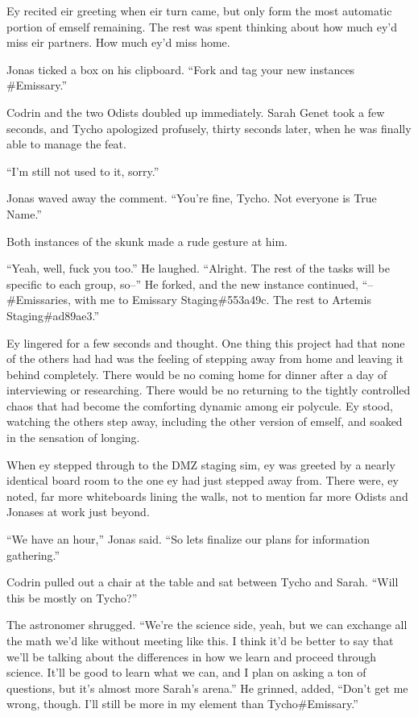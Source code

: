 Ey recited eir greeting when eir turn came, but only form the most automatic portion of emself remaining. The rest was spent thinking about how much ey'd miss eir partners. How much ey'd miss home.

Jonas ticked a box on his clipboard. ``Fork and tag your new instances \#Emissary.''

Codrin and the two Odists doubled up immediately. Sarah Genet took a few seconds, and Tycho apologized profusely, thirty seconds later, when he was finally able to manage the feat.

``I'm still not used to it, sorry.''

Jonas waved away the comment. ``You're fine, Tycho. Not everyone is True Name.''

Both instances of the skunk made a rude gesture at him.

``Yeah, well, fuck you too.'' He laughed. ``Alright. The rest of the tasks will be specific to each group, so--'' He forked, and the new instance continued, ``--\#Emissaries, with me to Emissary Staging\#553a49c. The rest to Artemis Staging\#ad89ae3.''

Ey lingered for a few seconds and thought. One thing this project had that none of the others had had was the feeling of stepping away from home and leaving it behind completely. There would be no coming home for dinner after a day of interviewing or researching. There would be no returning to the tightly controlled chaos that had become the comforting dynamic among eir polycule. Ey stood, watching the others step away, including the other version of emself, and soaked in the sensation of longing.

When ey stepped through to the DMZ staging sim, ey was greeted by a nearly identical board room to the one ey had just stepped away from. There were, ey noted, far more whiteboards lining the walls, not to mention far more Odists and Jonases at work just beyond.

``We have an hour,'' Jonas said. ``So lets finalize our plans for information gathering.''

Codrin pulled out a chair at the table and sat between Tycho and Sarah. ``Will this be mostly on Tycho?''

The astronomer shrugged. ``We're the science side, yeah, but we can exchange all the math we'd like without meeting like this. I think it'd be better to say that we'll be talking about the differences in how we learn and proceed through science. It'll be good to learn what we can, and I plan on asking a ton of questions, but it's almost more Sarah's arena.'' He grinned, added, ``Don't get me wrong, though. I'll still be more in my element than Tycho\#Emissary.''

